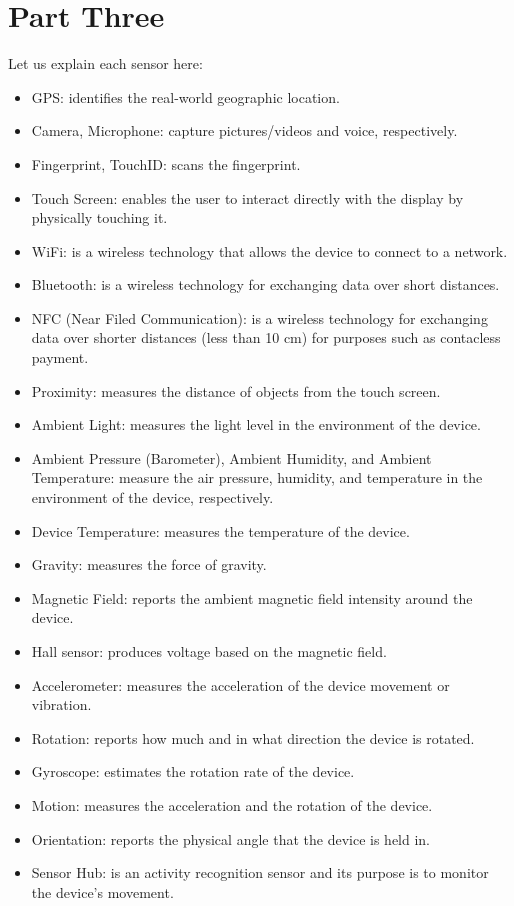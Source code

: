 \documentclass[10pt,twocolumn]{article}
\begin{document}
\section*{Part Three}
\label{part3}
Let us explain each sensor here:
\begin{itemize}
\item GPS: identifies the real-world geographic location. 
\item Camera, Microphone: capture pictures/videos and voice, respectively.
\item Fingerprint, TouchID: scans the fingerprint. \item Touch Screen: enables the user to interact directly with the display by physically touching it. 
\item WiFi: is a wireless technology that allows the device to connect to a network.
\item Bluetooth: is a wireless technology for exchanging data over short distances.
\item NFC (Near Filed Communication): is a wireless technology for exchanging data over shorter distances (less than 10 cm) for purposes such as contacless payment.  
\item Proximity: measures the distance of objects from the touch screen. 
\item Ambient Light: measures the light level in the environment of the device.
\item Ambient Pressure (Barometer), Ambient Humidity, and Ambient Temperature: measure the air pressure, humidity, and temperature in the environment of the device, respectively.
\item Device Temperature: measures the temperature of the device. 
\item Gravity: measures the force of gravity.
\item Magnetic Field: reports the ambient magnetic field intensity around the device.
\item Hall sensor: produces voltage based on the magnetic field.
\item Accelerometer: measures the acceleration of the device movement or vibration.
\item Rotation: reports how much and in what direction the device is rotated. 
\item Gyroscope: estimates the rotation rate of the device. 
\item Motion: measures the acceleration and the rotation of the device.  
\item Orientation: reports the physical angle that the device is held in.
\item Sensor Hub: is an activity recognition sensor and its purpose is to monitor the device's movement.
\end{itemize}
\end{document}
